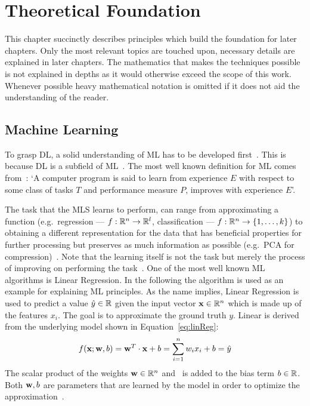 \cleardoublepage
\chapter*{Theoretical Foundation}\label{ch:theoretical}
This chapter succinctly describes principles which build the foundation for later chapters.
Only the most relevant topics are touched upon, necessary details are explained in later chapters.
The mathematics that makes the techniques possible is not explained in depths as it would otherwise
exceed the scope of this work.
Whenever possible heavy mathematical notation is omitted if it does not aid the understanding of the
reader.

\section{Machine Learning}
To grasp \ac{DL}, a solid understanding of \ac{ML} has to be developed
first~\citep{goodfellow_deep_2016}.
This is because \ac{DL} is a subfield of \ac{ML}~\citep{chauhan_review_2018}.
The most well known definition for \ac{ML} comes from~\cite{mitchell_machine_1997}:
`A computer program is said to learn from experience $E$ with respect to some class of tasks $T$
and performance measure $P$, improves with experience $E$'.

The task that the \ac{MLS} learns to perform, can range from approximating a function
(e.g.\ regression --- $f:\mathbb{R}^n \rightarrow \mathbb{R}^l$, classification ---
$f:\mathbb{R}^n \rightarrow \{1,\ldots,k\}$) to obtaining a different representation for the data that
has beneficial properties for further processing but preserves as much information as possible
(e.g.\ PCA for compression)~\citep{goodfellow_deep_2016}.
Note that the learning itself is not the task but merely the process of improving on performing the
task~\citep{goodfellow_deep_2016}.
One of the most well known \ac{ML} algorithms is Linear Regression.
In the following the algorithm is used as an example for explaining \ac{ML} principles.
As the name implies, Linear Regression is used to predict a value $\hat{y}\in\mathbb{R}$ given the input vector
$\textbf{x}\in\mathbb{R}^n$ which is made up of the features $x_i$.
The goal is to approximate the ground truth $y$.
Linear is derived from the underlying model shown in Equation~\ref{eq:linReg}:
\begin{equation}\label{eq:linReg}
    f(\textbf{x};\textbf{w},b) = \textbf{w}^{T} \cdot \textbf{x} + b = \sum_{i=1}^{n} w_i x_i + b = \hat{y}
\end{equation}
The scalar product of the weights $\textbf{w}\in\mathbb{R}^n$ and \x\ is added to the bias term $b\in\mathbb{R}$.
Both $\textbf{w},b$ are parameters that are learned by the model in order to optimize the
approximation~\citep{goodfellow_deep_2016}.

